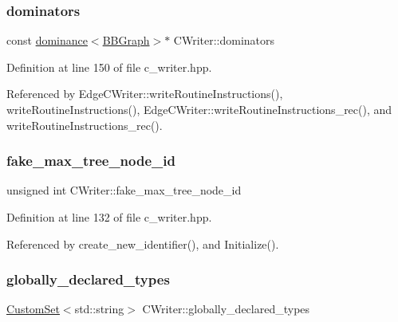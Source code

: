 \mbox{\label{classCWriter_a0e081b5f4f221cfda2d094935221cbef}} 
\subsubsection{\texorpdfstring{dominators}{dominators}}
{\footnotesize\ttfamily const \hyperlink{classdominance}{dominance}$<$\hyperlink{structBBGraph}{B\+B\+Graph}$>$$\ast$ C\+Writer\+::dominators\hspace{0.3cm}{\ttfamily [protected]}}



Definition at line 150 of file c\+\_\+writer.\+hpp.



Referenced by Edge\+C\+Writer\+::write\+Routine\+Instructions(), write\+Routine\+Instructions(), Edge\+C\+Writer\+::write\+Routine\+Instructions\+\_\+rec(), and write\+Routine\+Instructions\+\_\+rec().

\mbox{\label{classCWriter_aa107c55b07202727edfcb0ef22d2c0ea}} 
\subsubsection{\texorpdfstring{fake\+\_\+max\+\_\+tree\+\_\+node\+\_\+id}{fake\_max\_tree\_node\_id}}
{\footnotesize\ttfamily unsigned int C\+Writer\+::fake\+\_\+max\+\_\+tree\+\_\+node\+\_\+id\hspace{0.3cm}{\ttfamily [protected]}}



Definition at line 132 of file c\+\_\+writer.\+hpp.



Referenced by create\+\_\+new\+\_\+identifier(), and Initialize().

\mbox{\label{classCWriter_a534cbafda0454f4a454c529de5b1ce03}} 
\subsubsection{\texorpdfstring{globally\+\_\+declared\+\_\+types}{globally\_declared\_types}}
{\footnotesize\ttfamily \hyperlink{custom__set_8hpp_a615bc2f42fc38a4bb1790d12c759e86f}{Custom\+Set}$<$std\+::string$>$ C\+Writer\+::globally\+\_\+declared\+\_\+types\hspace{0.3cm}{\ttfamily [protected]}}



